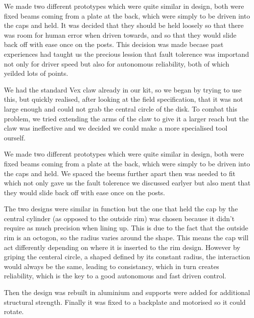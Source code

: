 \documentclass[../../../main.tex]{subfiles}
\begin{document}
We made two different prototypes which were quite similar in design, both were fixed beams coming from a plate at the back, which were simply to be driven into the caps and held.
It was decided that they should be held loosely so that there was room for human error when driven towards, and so that they would slide back off with ease once on the posts.
This decision was made becase past experiences had taught us the precious lession that fault tolerence was importand not only for driver speed but also for autonomous reliability, both of which yeilded lots of points.
\par

We had the standard Vex claw already in our kit, so we began by trying to use this, but quickly realised, after looking at the field specification, that it was not large enough and could not grab the central circle of the disk.
To combat this problem, we tried extending the arms of the claw to give it a larger reach but the claw was ineffective and we decided we could make a more specialised tool ourself.
\par


We made two different prototypes which were quite similar in design, both were fixed beams coming from a plate at the back, which were simply to be driven into the caps and held.
We spaced the beems further apart then was needed to fit which not only gave us the fault tolerence we discussed earlyer but also ment that they would slide back off with ease once on the posts.

The two designs were similar in function but the one that held the cap by the
central cylinder (as opposed to the outside rim) was chosen because it didn’t
require as much precision when lining up. This is due to the fact that the outside rim
is an octogon, so the radius varies around the shape. This means the cap will act differently
depending on where it is inserted to the rim design. However by griping the centeral circle,
a shaped defined by its constant radius, the interaction would always be the same, leading to
consistancy, which in turn creates reliability, which is the key to a good autonomous and
fast driven control.
\par

Then the design was rebuilt in aluminium and supports were added for additional structural strength.
Finally it was fixed to a backplate and motorised so it could rotate.
\end{document}
